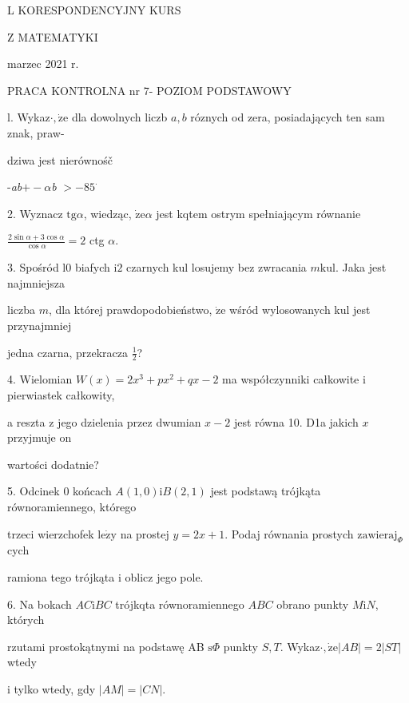 \documentclass[a4paper,12pt]{article}
\begin{document}
L KORESPONDENCYJNY KURS

Z MATEMATYKI

marzec 2021 r.

PRACA KONTROLNA nr 7- POZIOM PODSTAWOWY

l. Wykaz$\cdot, \dot{\mathrm{z}}\mathrm{e}$ dla dowolnych liczb $a, b$ róznych od zera, posiadających ten sam znak, praw-

dziwa jest nierównośč

-{\it ab}$+-\alpha${\it b} $> -85^{\cdot}$

2. Wyznacz $\mathrm{t}\mathrm{g}\alpha$, wiedząc, $\dot{\mathrm{z}}\mathrm{e}\alpha$ jest kqtem ostrym spełniającym równanie

$\displaystyle \frac{2\sin\alpha+3\cos\alpha}{\cos\alpha}=2$ ctg $\alpha.$

3. Spośród l0 biafych $\mathrm{i}2$ czarnych kul losujemy bez zwracania $m\mathrm{k}\mathrm{u}\mathrm{l}$. Jaka jest najmniejsza

liczba $m$, dla której prawdopodobieństwo, $\dot{\mathrm{z}}\mathrm{e}$ wśród wylosowanych kul jest przynajmniej

jedna czarna, przekracza $\displaystyle \frac{1}{2}$?

4. Wielomian $W(x)=2x^{3}+px^{2}+qx-2$ ma współczynniki całkowite $\mathrm{i}$ pierwiastek całkowity,

a reszta $\mathrm{z}$ jego dzielenia przez dwumian $x-2$ jest równa 10. D1a jakich $x$ przyjmuje on

wartości dodatnie?

5. Odcinek $0$ końcach $A(1,0) \mathrm{i}B(2,1)$ jest podstawą trójkąta równoramiennego, którego

trzeci wierzchofek $\mathrm{l}\mathrm{e}\dot{\mathrm{z}}\mathrm{y}$ na prostej $y=2x+1$. Podaj równania prostych $\mathrm{z}\mathrm{a}\mathrm{w}\mathrm{i}\mathrm{e}\mathrm{r}\mathrm{a}\mathrm{j}_{\Phi}$cych

ramiona tego trójkąta $\mathrm{i}$ oblicz jego pole.

6. Na bokach $AC\mathrm{i}BC$ trójkqta równoramiennego $ABC$ obrano punkty $M\mathrm{i}N$, których

rzutami prostokątnymi na podstawę AB $\mathrm{s}\Phi$ punkty $S, T$. Wykaz$\cdot, \dot{\mathrm{z}}\mathrm{e}|AB|=2|ST|$ wtedy

$\mathrm{i}$ tylko wtedy, gdy $|AM|=|CN|.$
\end{document}
